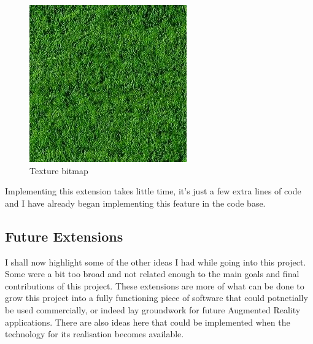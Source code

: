 \documentclass[11pt]{article}
\begin{document}
\begin{figure}[!h]
	\centering
	\includegraphics[scale=0.7]{pics/texture.jpg}
	\caption{Texture bitmap}
	\label{bitmap}
\end{figure}

Implementing this extension takes little time, it's just a few extra lines
of code and I have already began implementing this feature in the code base.

\subsection{Future Extensions}
I shall now highlight some of the other ideas I had while going into this 
project. Some were a bit too broad and not related enough to the main
goals and final contributions of this project. These extensions are more of what
can be done to grow this project into a fully functioning piece of 
software that could potnetially be used commercially, or indeed lay 
groundwork for future Augmented Reality applications. There are also ideas 
here that could be implemented when the technology for its realisation 
becomes available.
\end{document}
